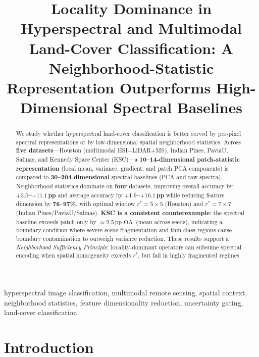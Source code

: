 \documentclass[journal]{IEEEtran}
\newcommand{\rstar}{r^{*}}
\newcommand{\pp}{\,\text{pp}}
\newcommand{\OA}{\ensuremath{\mathrm{OA}}}
\begin{document}
\title{Locality Dominance in Hyperspectral and Multimodal
       Land-Cover Classification: A Neighborhood-Statistic
       Representation Outperforms High-Dimensional Spectral Baselines}

\author{%
}

\maketitle

\begin{abstract}
We study whether hyperspectral land-cover classification is better
served by per-pixel spectral representations or by low-dimensional
spatial neighborhood statistics. Across \textbf{five datasets}---Houston
(multimodal HSI+LiDAR+MS), Indian Pines, PaviaU, Salinas, and Kennedy
Space Center (KSC)---a \textbf{10--14-dimensional patch-statistic
representation} (local mean, variance, gradient, and patch PCA
components) is compared to \textbf{30--204-dimensional} spectral
baselines (PCA and raw spectra). Neighborhood statistics dominate on
\textbf{four} datasets, improving overall accuracy by
$\mathbf{+3.0}$\textbf{--}$\mathbf{+11.1\pp}$ and average accuracy
by $\mathbf{+1.9}$\textbf{--}$\mathbf{+16.1\pp}$ while reducing
feature dimension by \textbf{76--97\%}, with optimal window
$\rstar{=}5{\times}5$ (Houston) and $\rstar{=}7{\times}7$ (Indian
Pines/PaviaU/Salinas). \textbf{KSC is a consistent counterexample}:
the spectral baseline exceeds patch-only by ${\approx}2.5\pp$ \OA\
(mean across seeds), indicating a boundary condition where severe scene
fragmentation and thin class regions cause boundary contamination to
outweigh variance reduction. These results support a
\emph{Neighborhood Sufficiency Principle}: locality-dominant operators
can subsume spectral encoding when spatial homogeneity exceeds
$\rstar$, but fail in highly fragmented regimes.
\end{abstract}

\begin{IEEEkeywords}
hyperspectral image classification, multimodal remote sensing,
spatial context, neighborhood statistics, feature dimensionality
reduction, uncertainty gating, land-cover classification.
\end{IEEEkeywords}

\section{Introduction}
\label{sec:intro}
\end{document}
